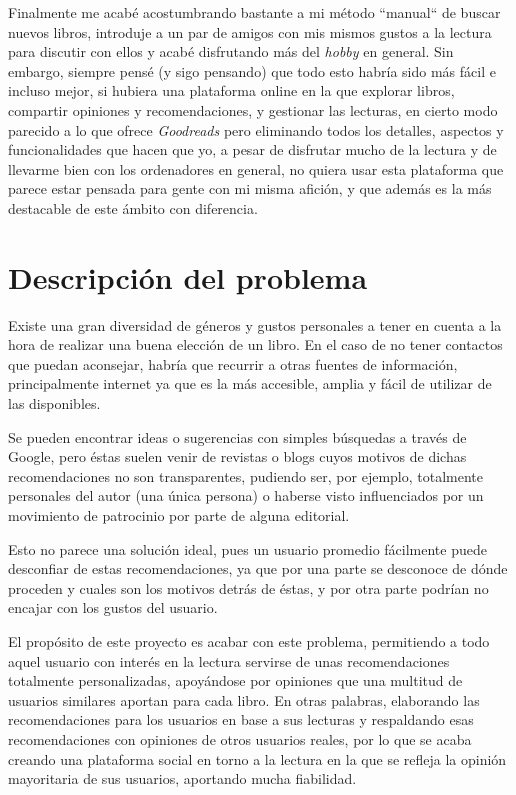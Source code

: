 Finalmente me acabé acostumbrando bastante a mi método ``manual`` de buscar nuevos libros, introduje a un par de amigos con mis mismos gustos a la lectura para discutir con ellos y acabé disfrutando más del \textit{hobby} en general. Sin embargo, siempre pensé (y sigo pensando) que todo esto habría sido más fácil e incluso mejor, si hubiera una plataforma online en la que explorar libros, compartir opiniones y recomendaciones, y gestionar las lecturas, en cierto modo parecido a lo que ofrece \textit{Goodreads} pero eliminando todos los detalles, aspectos y funcionalidades que hacen que yo, a pesar de disfrutar mucho de la lectura y de llevarme bien con los ordenadores en general, no quiera usar esta plataforma que parece estar pensada para gente con mi misma afición, y que además es la más destacable de este ámbito con diferencia.

\section{Descripción del problema}

Existe una gran diversidad de géneros y gustos personales a tener en cuenta a la hora de realizar una buena elección de un libro. En el caso de no tener contactos que puedan aconsejar, habría que recurrir a otras fuentes de información, principalmente internet ya que es la más accesible, amplia y fácil de utilizar de las disponibles.

Se pueden encontrar ideas o sugerencias con simples búsquedas a través de Google, pero éstas suelen venir de revistas o blogs cuyos motivos de dichas recomendaciones no son transparentes, pudiendo ser, por ejemplo, totalmente personales del autor (una única persona) o haberse visto influenciados por un movimiento de patrocinio por parte de alguna editorial.

Esto no parece una solución ideal, pues un usuario promedio fácilmente puede desconfiar de estas recomendaciones, ya que por una parte se desconoce de dónde proceden y cuales son los motivos detrás de éstas, y por otra parte podrían no encajar con los gustos del usuario.

El propósito de este proyecto es acabar con este problema, permitiendo a todo aquel usuario con interés en la lectura servirse de unas recomendaciones totalmente personalizadas, apoyándose por opiniones que una multitud de usuarios similares aportan para cada libro. En otras palabras, elaborando las recomendaciones para los usuarios en base a sus lecturas y respaldando esas recomendaciones con opiniones de otros usuarios reales, por lo que se acaba creando una plataforma social en torno a la lectura en la que se refleja la opinión mayoritaria de sus usuarios, aportando mucha fiabilidad.

